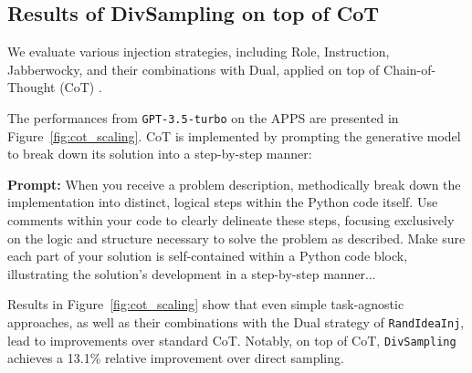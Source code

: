 \subsection{Results of DivSampling on top of CoT}
We evaluate various injection strategies, including Role, Instruction, Jabberwocky, and their combinations with Dual, applied on top of Chain-of-Thought (CoT) \citep{wei2022chain, cot2}.

The performances from \texttt{GPT-3.5-turbo} on the APPS are presented in Figure~\ref{fig:cot_scaling}. CoT is implemented by prompting the generative model to break down its solution into a step-by-step manner:
\begin{tcolorbox}[title=Example CoT Prompt, colframe=low]
\scriptsize{
\textbf{Prompt:} When you receive a problem description, methodically break down the implementation into distinct, logical steps within the Python code itself. Use comments within your code to clearly delineate these steps, focusing exclusively on the logic and structure necessary to solve the problem as described. Make sure each part of your solution is self-contained within a Python code block, illustrating the solution's development in a step-by-step manner...
  }
\end{tcolorbox}
\normalsize 
Results in Figure~\ref{fig:cot_scaling} show  that even simple task-agnostic approaches, as well as their  combinations with the Dual strategy of \texttt{RandIdeaInj}, lead to improvements over standard CoT. Notably, on top of CoT, \texttt{DivSampling} achieves a 13.1\% relative improvement over direct sampling.




